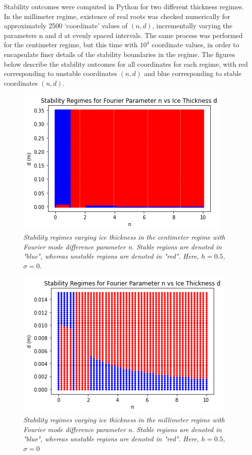 \documentclass{article}
\begin{document}
Stability outcomes were computed in Python for two different thickness regimes. In the millimeter regime, existence of real roots was checked numerically for approximately 2500 `coordinate' values of \((n,d)\), incrementally varying the parameters n and d at evenly spaced intervals. The same process was performed for the centimeter regime, but this time with \(10^4\) coordinate values, in order to encapsulate finer details of the stability boundaries in the regime. The figures below describe the stability outcomes for all coordinates for each regime, with red corresponding to unstable coordinates \((n,d)\) and blue corresponding to stable coordinates \((n,d)\). \\

\begin{figure}[hbt!]
\centering
\includegraphics[scale = .8]{Stability CM .png}
\caption{ \emph{Stability regimes varying ice thickness in the centimeter regime with Fourier mode difference parameter n. Stable regions are denoted in "blue", whereas unstable regions are denoted in "red". Here, \(h = 0.5\), \(\sigma = 0\). }} \label{CM}
\end{figure}


\begin{figure}[hbt!]
\centering
\includegraphics[scale = .8]{Stability MM.png}
\caption{\emph{Stability regimes varying ice thickness in the millimeter regime with Fourier mode difference parameter n. Stable regions are denoted in "blue", whereas unstable regions are denoted in "red". Here, \(h = 0.5\), \(\sigma = 0\)}} \label{MM}
\end{figure}
\end{document}

